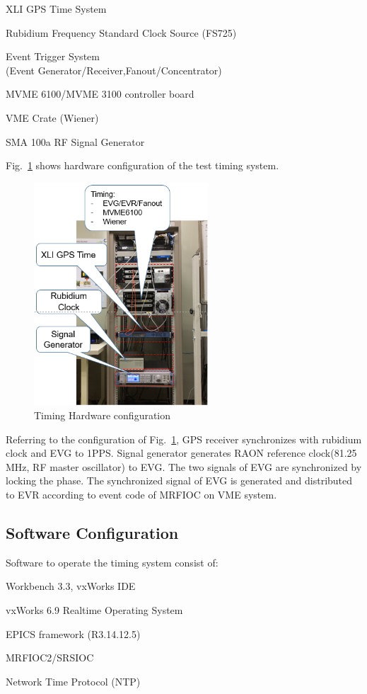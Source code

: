 \documentclass[a4paper,
              ]{jacow}
\begin{document}
\begin{Itemize}
	\item XLI GPS Time System
	\item Rubidium Frequency Standard Clock Source (FS725)
	\item Event Trigger System \\
	(Event Generator/Receiver,Fanout/Concentrator)
	\item MVME 6100/MVME 3100 controller board 
	\item VME Crate (Wiener)
	\item SMA 100a RF Signal Generator
\end{Itemize}
\hfil\break
Fig.~\ref{timing:rack} shows hardware configuration of the test timing system. 
\begin{figure}[!htb]
	\centering
	\includegraphics*[width=65mm]{timing_rack}
	\caption{Timing Hardware configuration }
	\label{timing:rack}
\end{figure}

Referring to the configuration of Fig.~\ref{timing:rack}, GPS receiver synchronizes with rubidium clock and EVG to 1PPS. Signal generator generates RAON reference clock(81.25 MHz, RF master oscillator) to EVG. The two signals of EVG are synchronized by locking the phase. The synchronized signal of EVG is generated and distributed to EVR according to event code of MRFIOC on VME system.

\subsection{Software Configuration}
Software to operate the timing system consist of:
\begin{Itemize}
	\item Workbench 3.3, vxWorks IDE
	\item vxWorks 6.9 Realtime Operating System
	\item EPICS framework (R3.14.12.5)
	\item MRFIOC2/SRSIOC 
	\item Network Time Protocol (NTP)
\end{Itemize}
\end{document}
